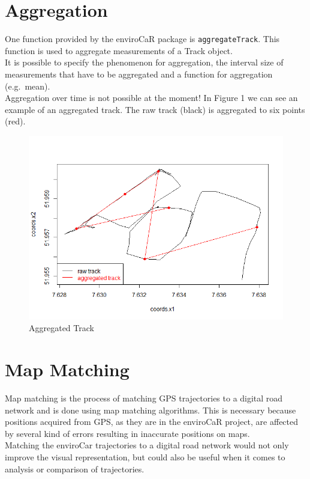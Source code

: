 \documentclass[]{article}
\begin{document}
\section{Aggregation}\label{aggregation}

One function provided by the enviroCaR package is
\texttt{aggregateTrack}. This function is used to aggregate measurements
of a Track object.\\It is possible to specify the phenomenon for
aggregation, the interval size of measurements that have to be
aggregated and a function for aggregation (e.g.~mean).\\Aggregation over
time is not possible at the moment! In Figure 1 we can see an example of
an aggregated track. The raw track (black) is aggregated to six points
(red).

\begin{figure}[htbp]
\centering
\includegraphics{figures/agg.png}
\caption{Aggregated Track}
\end{figure}

\section{Map Matching}\label{map-matching}

Map matching is the process of matching GPS trajectories to a digital
road network and is done using map matching algorithms. This is
necessary because positions acquired from GPS, as they are in the
enviroCaR project, are affected by several kind of errors resulting in
inaccurate positions on maps.\\Matching the enviroCar trajectories to a
digital road network would not only improve the visual representation,
but could also be useful when it comes to analysis or comparison of
trajectories.
\end{document}
